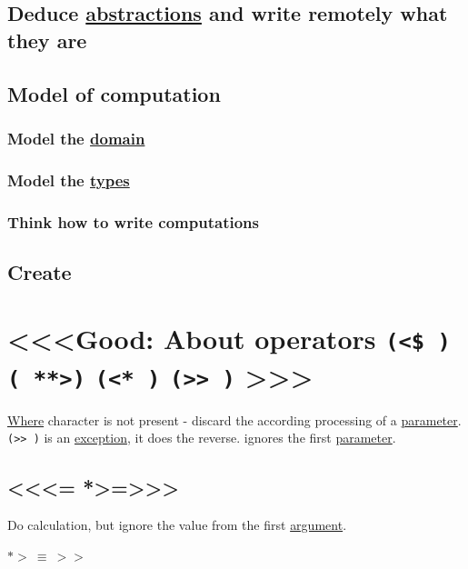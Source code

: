 \documentclass[a4paper,14pt,oneside]{book}
\begin{document}
\section{Deduce \hyperref[org394d42e]{abstractions} and write remotely what they are}
\label{sec:orgbd53cbe}

\section{Model of computation}
\label{sec:org6d64a14}

\subsection{Model the \hyperref[orga435ae0]{domain}}
\label{sec:org250c2bc}

\subsection{Model the \hyperref[org91cf53a]{types}}
\label{sec:org5d6dfa6}

\subsection{Think how to write computations}
\label{sec:org2ba7658}

\section{Create}
\label{sec:org5eacdfc}

\chapter{<<<Good: About operators \texttt{(<\$ )} \texttt{( **>)} \texttt{(<* )} \texttt{(>> )} >>>}
\label{sec:orgc659877}
\hyperref[orgbe7070f]{Where} character is not present - discard the according processing of a \hyperref[org08c9428]{parameter}.
\texttt{(>> )} is an \hyperref[org0ed715d]{exception}, it does the reverse. ignores the first \hyperref[org08c9428]{parameter}.

\section{<<<= *>=>>>}
\label{sec:org783d271}
Do calculation, but ignore the value from the first \hyperref[org7be5baf]{argument}.

\(*> \ \equiv \ >>\)
\end{document}
